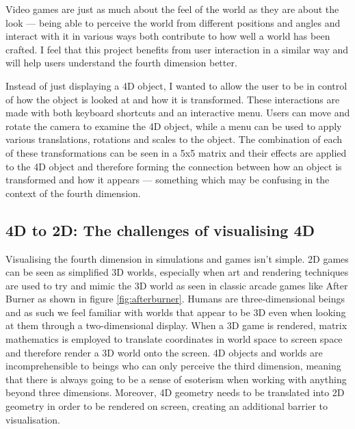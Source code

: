 \documentclass[11pt, a4paper]{article}
\begin{document}
Video games are just as much about the feel of the world as they are about the look --- being able to perceive the world from different positions and angles and interact with it in various ways both contribute to how well a world has been crafted. I feel that this project benefits from user interaction in a similar way and will help users understand the fourth dimension better.

Instead of just displaying a 4D object, I wanted to allow the user to be in control of how the object is looked at and how it is transformed. These interactions are made with both keyboard shortcuts and an interactive menu. Users can move and rotate the camera to examine the 4D object, while a menu can be used to apply various translations, rotations and scales to the object. The combination of each of these transformations can be seen in a 5x5 matrix and their effects are applied to the 4D object and therefore forming the connection between how an object is transformed and how it appears --- something which may be confusing in the context of the fourth dimension.

\subsection{4D to 2D: The challenges of visualising 4D}
\label{subsec:challenges}

Visualising the fourth dimension in simulations and games isn't simple. 2D games can be seen as simplified 3D worlds, especially when art and rendering techniques are used to try and mimic the 3D world as seen in classic arcade games like After Burner \parencite{afterburner} as shown in figure \ref{fig:afterburner}. Humans are three-dimensional beings and as such we feel familiar with worlds that appear to be 3D even when looking at them through a two-dimensional display. When a 3D game is rendered, matrix mathematics is employed to translate coordinates in world space to screen space and therefore render a 3D world onto the screen. 4D objects and worlds are incomprehensible to beings who can only perceive the third dimension, meaning that there is always going to be a sense of esoterism when working with anything beyond three dimensions. Moreover, 4D geometry needs to be translated into 2D geometry in order to be rendered on screen, creating an additional barrier to visualisation.
\end{document}
